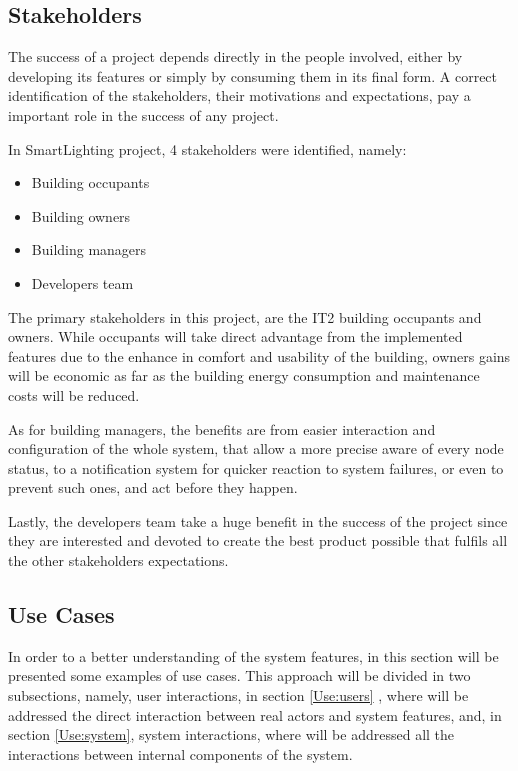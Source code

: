 \subsection{Stakeholders}
\label{Architecture:Stakeholders}

The success of a project depends directly in the people involved, either by developing its features or simply by consuming them in its final form. A correct identification of the stakeholders, their motivations and expectations, pay a important role in the success of any project. 

In SmartLighting project, 4 stakeholders were identified, namely:

\begin{itemize}
	\item Building occupants
	\item Building owners
	\item Building managers
	\item Developers team
\end{itemize}


The primary stakeholders in this project, are the IT2 building occupants and owners. While occupants will take direct advantage from the implemented features due to the enhance in comfort and usability of the building, owners gains will be economic as far as the building energy consumption and maintenance costs will be reduced.

As for building managers, the benefits are from easier interaction and configuration of the whole system, that allow a more precise aware of every node status, to a notification system for quicker reaction to system failures, or even to prevent such ones, and act before they happen.

Lastly, the developers team take a huge benefit in the success of the project since they are interested and devoted to create the best product possible that fulfils all the other stakeholders expectations.


\subsection{Use Cases}
\label{Architecture:SLusecases}
In order to a better understanding of the system features, in this section will be presented some examples of use cases. This approach will be divided in two subsections, namely, user interactions, in section \ref{Use:users} , where will be addressed the direct interaction between real actors and system features, and, in section \ref{Use:system}, system interactions, where will be addressed all the interactions between internal components of the system.
\iffalse
